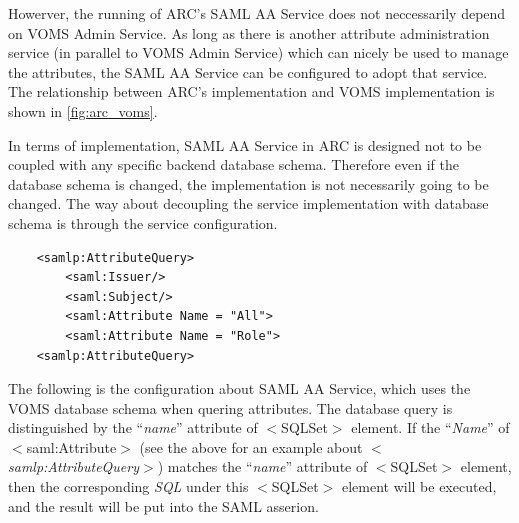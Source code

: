 \documentclass{article}                            %
\begin{document}
Howerver, the running of ARC's SAML AA Service does not neccessarily depend on VOMS Admin Service. As long as there is another attribute administration service (in parallel to VOMS Admin Service) which can nicely be used to manage the attributes, the SAML AA Service can be configured to adopt that service. The relationship between ARC's implementation and VOMS implementation is shown in \ref{fig:arc_voms}.

In terms of implementation, SAML AA Service in ARC is designed not to be coupled with any specific backend database schema. Therefore even if the database schema is changed, the implementation is not necessarily going to be changed. The way about decoupling the service implementation with database schema is through the service configuration.

\begin{verbatim}
    <samlp:AttributeQuery>
        <saml:Issuer/>
        <saml:Subject/>
        <saml:Attribute Name = "All">
        <saml:Attribute Name = "Role">
    <samlp:AttributeQuery>
\end{verbatim}

The following is the configuration about SAML AA Service, which uses the VOMS database schema when quering attributes.
The database query is distinguished by the ``\textit{name}'' attribute of $<$SQLSet$>$ element. If the ``\textit{Name}'' of $<$saml:Attribute$>$ (see the above for an example about \textit{$<$samlp:AttributeQuery$>$}) matches the ``\textit{name}'' attribute of $<$SQLSet$>$ element, then the corresponding \textit{SQL} under this $<$SQLSet$>$ element will be executed, and the result will be put into the SAML asserion.
\end{document}
